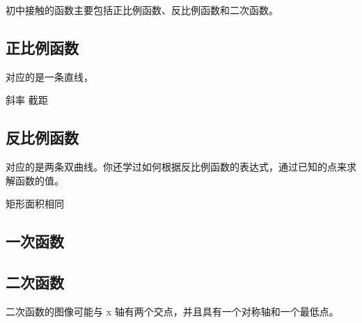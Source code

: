 
\begin{issues}
\issueDraft
\end{issues}

初中接触的函数主要包括正比例函数、反比例函数和二次函数。

\subsection{正比例函数}

对应的是一条直线，

斜率
截距

\subsection{反比例函数}

对应的是两条双曲线。你还学过如何根据反比例函数的表达式，通过已知的点来求解函数的值。

矩形面积相同

\subsection{一次函数}

\subsection{二次函数}

二次函数的图像可能与  x  轴有两个交点，并且具有一个对称轴和一个最低点。